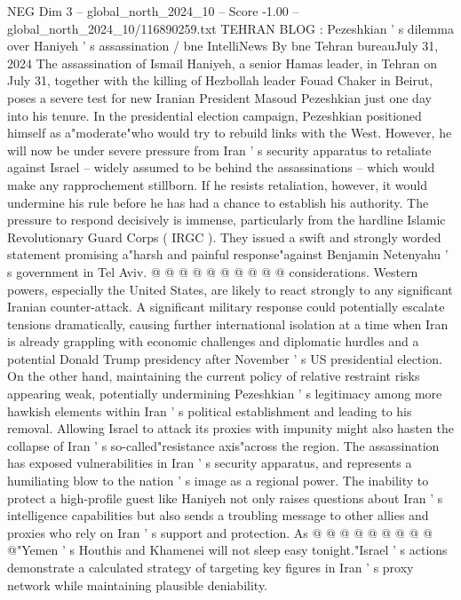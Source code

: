\begin{textsample}{NEG Dim 3 – global\_north\_2024\_10 – Score -1.00 – global\_north\_2024\_10/116890259.txt}  \label{ex:f3_neg_333}
TEHRAN BLOG : Pezeshkian ' s dilemma over Haniyeh ' s assassination / bne IntelliNews By bne Tehran bureauJuly 31, 2024 The assassination of Ismail Haniyeh, a senior Hamas leader, in Tehran on July 31, together with the killing of Hezbollah leader Fouad Chaker in Beirut, poses a severe test for new Iranian President Masoud Pezeshkian just one day into his tenure.
In the presidential election campaign, Pezeshkian positioned himself as a"moderate"who would try to rebuild links with the West.
However, he will now be under severe pressure from Iran ' s security apparatus to retaliate against Israel -- widely assumed to be behind the assassinations -- which would make any rapprochement stillborn.
If he resists retaliation, however, it would undermine his rule before he has had a chance to establish his authority.
The pressure to respond decisively is immense, particularly from the hardline Islamic Revolutionary Guard Corps ( IRGC ).
They issued a swift and strongly worded statement promising a"harsh and painful response"against Benjamin Netenyahu ' s government in Tel Aviv. @ @ @ @ @ @ @ @ @ @ considerations.
Western powers, especially the United States, are likely to react strongly to any significant Iranian counter-attack.
A significant military response could potentially escalate tensions dramatically, causing further international isolation at a time when Iran is already grappling with economic challenges and diplomatic hurdles and a potential Donald Trump presidency after November ' s US presidential election.
On the other hand, maintaining the current policy of relative restraint risks appearing weak, potentially undermining Pezeshkian ' s legitimacy among more hawkish elements within Iran ' s political establishment and leading to his removal.
Allowing Israel to attack its proxies with impunity might also hasten the collapse of Iran ' s so-called"resistance axis"across the region.
The assassination has exposed vulnerabilities in Iran ' s security apparatus, and represents a humiliating blow to the nation ' s image as a regional power.
The inability to protect a high-profile guest like Haniyeh not only raises questions about Iran ' s intelligence capabilities but also sends a troubling message to other allies and proxies who rely on Iran ' s support and protection.
As @ @ @ @ @ @ @ @ @ @"Yemen ' s Houthis and Khamenei will not sleep easy tonight."Israel ' s actions demonstrate a calculated strategy of targeting key figures in Iran ' s proxy network while maintaining plausible deniability.

\end{textsample}
